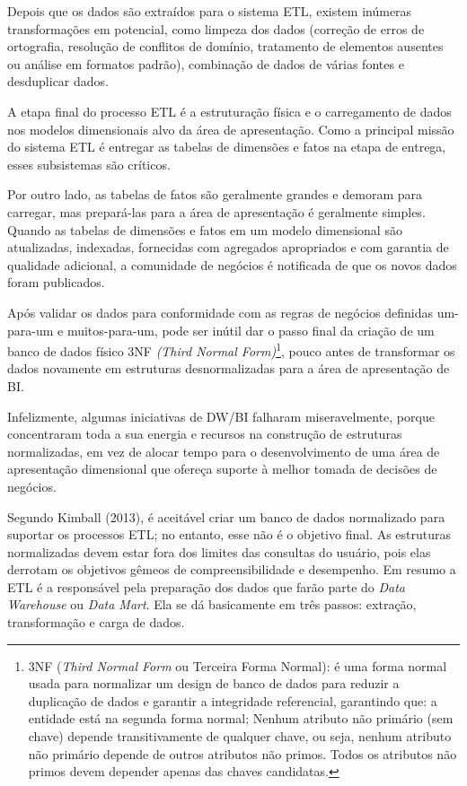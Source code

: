 Depois que os dados s\~{a}o extra\'{i}dos para o sistema ETL, existem inúmeras transforma\c{c}\~{o}es em potencial, como limpeza dos dados (corre\c{c}\~{a}o de erros de ortografia, resolu\c{c}\~{a}o de conflitos de dom\'{i}nio, tratamento de elementos ausentes ou an\'{a}lise em formatos padr\~{a}o), combina\c{c}\~{a}o de dados de v\'{a}rias fontes e desduplicar dados. 

A etapa final do processo ETL \'{e} a estrutura\c{c}\~{a}o f\'{i}sica e o carregamento de dados nos modelos dimensionais alvo da \'{a}rea de apresenta\c{c}\~{a}o. Como a principal miss\~{a}o do sistema ETL \'{e} entregar as tabelas de dimens\~{o}es e fatos na etapa de entrega, esses subsistemas s\~{a}o cr\'{i}ticos.

Por outro lado, as tabelas de fatos s\~{a}o geralmente grandes e demoram para carregar, mas prepar\'{a}-las para a \'{a}rea de apresenta\c{c}\~{a}o \'{e} geralmente simples. 
Quando as tabelas de dimens\~{o}es e fatos em um modelo dimensional s\~{a}o atualizadas, indexadas, fornecidas com agregados apropriados e com garantia de qualidade adicional, a comunidade de neg\'{o}cios \'{e} notificada de que os novos dados foram publicados.

Ap\'{o}s validar os dados para conformidade com as regras de neg\'{o}cios definidas um-para-um e muitos-para-um, pode ser inútil dar o passo final da cria\c{c}\~{a}o de um banco de dados f\'{i}sico 3NF \textit{(Third Normal Form)}\footnote{3NF (\textit{Third Normal Form} ou Terceira Forma Normal): \'{e} uma forma normal usada para normalizar um design de banco de dados para reduzir a duplica\c{c}\~{a}o de dados e garantir a integridade referencial, garantindo que: a entidade est\'{a} na segunda forma normal; Nenhum atributo n\~{a}o prim\'{a}rio (sem chave) depende transitivamente de qualquer chave, ou seja, nenhum atributo n\~{a}o prim\'{a}rio depende de outros atributos n\~{a}o primos. Todos os atributos n\~{a}o primos devem depender apenas das chaves candidatas.}, pouco antes de transformar os dados novamente em estruturas desnormalizadas para a \'{a}rea de apresenta\c{c}\~{a}o de BI.

Infelizmente, algumas iniciativas de DW/BI falharam miseravelmente, porque concentraram toda a sua energia e recursos na constru\c{c}\~{a}o de estruturas normalizadas, em vez de alocar tempo para o desenvolvimento de uma \'{a}rea de apresenta\c{c}\~{a}o dimensional que ofere\c{c}a suporte \`{a} melhor tomada de decis\~{o}es de neg\'{o}cios. 

Segundo Kimball (2013), \'{e} aceit\'{a}vel criar um banco de dados normalizado para suportar os processos ETL; no entanto, esse n\~{a}o \'{e} o objetivo final. As estruturas normalizadas devem estar fora dos limites das consultas do usu\'{a}rio, pois elas derrotam os objetivos g\^{e}meos de compreensibilidade e desempenho. 
Em resumo a ETL \'{e} a respons\'{a}vel pela prepara\c{c}\~{a}o dos dados que far\~{a}o parte
do \textit{Data Warehouse} ou \textit{Data Mart}. Ela se d\'{a} basicamente em três passos: extra\c{c}\~{a}o, transforma\c{c}\~{a}o e carga de dados.

